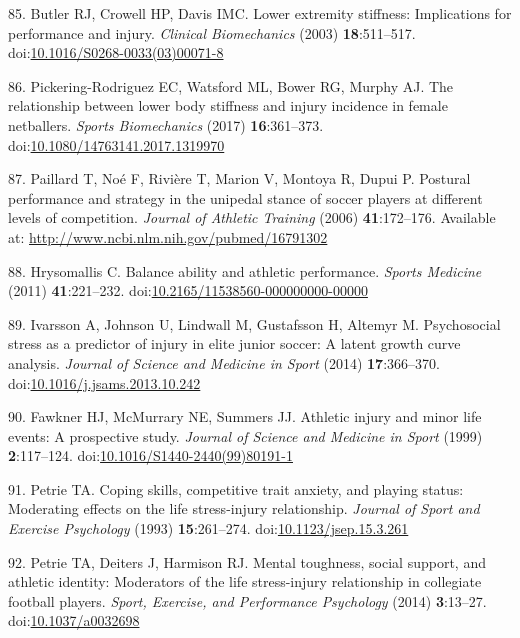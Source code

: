 \documentclass[
  english,
  man]{apa6}
\newenvironment{cslreferences}%
  {}%
  {\par}
\begin{document}
\begin{cslreferences}
\leavevmode\hypertarget{ref-Butler2003}{}%
85. Butler RJ, Crowell HP, Davis IMC. Lower extremity stiffness: Implications for performance and injury. \emph{Clinical Biomechanics} (2003) \textbf{18}:511--517. doi:\href{https://doi.org/10.1016/S0268-0033(03)00071-8}{10.1016/S0268-0033(03)00071-8}

\leavevmode\hypertarget{ref-PickeringRodriguez2017}{}%
86. Pickering-Rodriguez EC, Watsford ML, Bower RG, Murphy AJ. The relationship between lower body stiffness and injury incidence in female netballers. \emph{Sports Biomechanics} (2017) \textbf{16}:361--373. doi:\href{https://doi.org/10.1080/14763141.2017.1319970}{10.1080/14763141.2017.1319970}

\leavevmode\hypertarget{ref-Paillard2006}{}%
87. Paillard T, Noé F, Rivière T, Marion V, Montoya R, Dupui P. Postural performance and strategy in the unipedal stance of soccer players at different levels of competition. \emph{Journal of Athletic Training} (2006) \textbf{41}:172--176. Available at: \url{http://www.ncbi.nlm.nih.gov/pubmed/16791302}

\leavevmode\hypertarget{ref-Hrysomallis2011}{}%
88. Hrysomallis C. Balance ability and athletic performance. \emph{Sports Medicine} (2011) \textbf{41}:221--232. doi:\href{https://doi.org/10.2165/11538560-000000000-00000}{10.2165/11538560-000000000-00000}

\leavevmode\hypertarget{ref-Ivarsson2014}{}%
89. Ivarsson A, Johnson U, Lindwall M, Gustafsson H, Altemyr M. Psychosocial stress as a predictor of injury in elite junior soccer: A latent growth curve analysis. \emph{Journal of Science and Medicine in Sport} (2014) \textbf{17}:366--370. doi:\href{https://doi.org/10.1016/j.jsams.2013.10.242}{10.1016/j.jsams.2013.10.242}

\leavevmode\hypertarget{ref-Fawkner1999}{}%
90. Fawkner HJ, McMurrary NE, Summers JJ. Athletic injury and minor life events: A prospective study. \emph{Journal of Science and Medicine in Sport} (1999) \textbf{2}:117--124. doi:\href{https://doi.org/10.1016/S1440-2440(99)80191-1}{10.1016/S1440-2440(99)80191-1}

\leavevmode\hypertarget{ref-Petrie1993}{}%
91. Petrie TA. Coping skills, competitive trait anxiety, and playing status: Moderating effects on the life stress-injury relationship. \emph{Journal of Sport and Exercise Psychology} (1993) \textbf{15}:261--274. doi:\href{https://doi.org/10.1123/jsep.15.3.261}{10.1123/jsep.15.3.261}

\leavevmode\hypertarget{ref-Petrie2014}{}%
92. Petrie TA, Deiters J, Harmison RJ. Mental toughness, social support, and athletic identity: Moderators of the life stress-injury relationship in collegiate football players. \emph{Sport, Exercise, and Performance Psychology} (2014) \textbf{3}:13--27. doi:\href{https://doi.org/10.1037/a0032698}{10.1037/a0032698}


\end{cslreferences}
\end{document}
